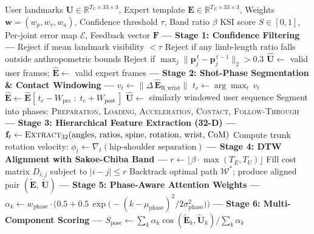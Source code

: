 \documentclass[pdflatex,sn-mathphys-num]{sn-jnl}%
\theoremstyle{thmstyleone}%
\theoremstyle{thmstyletwo}%
\theoremstyle{thmstylethree}%
\begin{document}
\begin{algorithm}[htbp]
\caption{   Kinematic Similarity Index (KSI)}
\label{alg:ksi}
\begin{algorithmic}[1]
\Require User landmarks $\mathbf{U} \in \mathbb{R}^{T_U \times 33 \times 3}$, Expert template $\mathbf{E} \in \mathbb{R}^{T_E \times 33 \times 3}$, Weights $\mathbf{w} = (w_p, w_v, w_a)$, Confidence threshold $\tau$, Band ratio $\beta$
\Ensure KSI score $S \in [0,1]$, Per-joint error map $\mathcal{E}$, Feedback vector $\mathbf{F}$
\Statex
\State \textbf{--- Stage 1: Confidence Filtering ---}
    \State Reject if mean landmark visibility $< \tau$
    \State Reject if any limb-length ratio falls outside anthropometric bounds
    \State Reject if $\max_j \|\mathbf{p}_j^{\,t} - \mathbf{p}_j^{\,t-1}\|_2 > 0.3$ 
\EndFor
\State $\hat{\mathbf{U}} \leftarrow$ valid user frames; \quad $\hat{\mathbf{E}} \leftarrow$ valid expert frames
\Statex
\State \textbf{--- Stage 2: Shot-Phase Segmentation \& Contact Windowing ---}
\State $v_t \leftarrow \|\Delta\, \hat{\mathbf{E}}_{\text{R\_wrist}}\|$ 
\State $t_c \leftarrow \arg\max_t\, v_t$ 
\State $\hat{\mathbf{E}} \leftarrow \hat{\mathbf{E}}[\,t_c - W_{\text{pre}} \;:\; t_c + W_{\text{post}}\,]$
\State $\hat{\mathbf{U}} \leftarrow$ similarly windowed user sequence
\State Segment into phases: \textsc{Preparation, Loading, Acceleration, Contact, Follow-Through}
\Statex
\State \textbf{--- Stage 3: Hierarchical Feature Extraction (32-D) ---}
    \State $\mathbf{f}_t \leftarrow \textsc{Extract}_{32}(\text{angles, ratios, spine, rotation, wrist, CoM})$
\EndFor
\State Compute trunk rotation velocity: $\dot{\phi}_t \leftarrow \nabla_t(\text{hip-shoulder separation})$
\Statex
\State \textbf{--- Stage 4: DTW Alignment with Sakoe-Chiba Band ---}
\State $r \leftarrow \lfloor \beta \cdot \max(T_E, T_U) \rfloor$ 
\State Fill cost matrix $D_{i,j}$ subject to $|i-j| \le r$
\State Backtrack optimal path $\mathcal{W}^{*}$; produce aligned pair $(\tilde{\mathbf{E}},\, \tilde{\mathbf{U}})$
\Statex
\State \textbf{--- Stage 5: Phase-Aware Attention Weights ---}
    \State $\alpha_k \leftarrow w_{\text{phase}} \cdot \bigl(0.5 + 0.5\,\exp\!\bigl(-{(k - \mu_{\text{phase}})^2}/{2\sigma_{\text{phase}}^2}\bigr)\bigr)$
\EndFor
\Statex
\State \textbf{--- Stage 6: Multi-Component Scoring ---} 
\State $S_{\text{pose}} \leftarrow {\sum_k \alpha_k \cos(\tilde{\mathbf{E}}_k, \tilde{\mathbf{U}}_k)}/{\sum_k \alpha_k}$

\end{algorithmic}
\end{algorithm}
\end{document}
